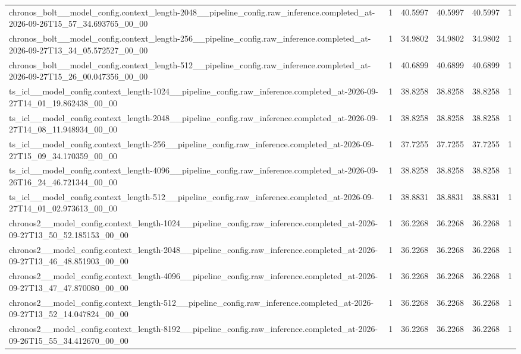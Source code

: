 \begin{tabular}{llllll}
chronos\_bolt\_\_model\_config.context\_length-2048\_\_pipeline\_config.raw\_inference.completed\_at-2026-09-26T15\_57\_34.693765\_00\_00 & 1 & 40.5997 & 40.5997 & 40.5997 & 1 \\
chronos\_bolt\_\_model\_config.context\_length-256\_\_pipeline\_config.raw\_inference.completed\_at-2026-09-27T13\_34\_05.572527\_00\_00 & 1 & 34.9802 & 34.9802 & 34.9802 & 1 \\
chronos\_bolt\_\_model\_config.context\_length-512\_\_pipeline\_config.raw\_inference.completed\_at-2026-09-27T15\_26\_00.047356\_00\_00 & 1 & 40.6899 & 40.6899 & 40.6899 & 1 \\
ts\_icl\_\_model\_config.context\_length-1024\_\_pipeline\_config.raw\_inference.completed\_at-2026-09-27T14\_01\_19.862438\_00\_00 & 1 & 38.8258 & 38.8258 & 38.8258 & 1 \\
ts\_icl\_\_model\_config.context\_length-2048\_\_pipeline\_config.raw\_inference.completed\_at-2026-09-27T14\_08\_11.948934\_00\_00 & 1 & 38.8258 & 38.8258 & 38.8258 & 1 \\
ts\_icl\_\_model\_config.context\_length-256\_\_pipeline\_config.raw\_inference.completed\_at-2026-09-27T15\_09\_34.170359\_00\_00 & 1 & 37.7255 & 37.7255 & 37.7255 & 1 \\
ts\_icl\_\_model\_config.context\_length-4096\_\_pipeline\_config.raw\_inference.completed\_at-2026-09-26T16\_24\_46.721344\_00\_00 & 1 & 38.8258 & 38.8258 & 38.8258 & 1 \\
ts\_icl\_\_model\_config.context\_length-512\_\_pipeline\_config.raw\_inference.completed\_at-2026-09-27T14\_01\_02.973613\_00\_00 & 1 & 38.8831 & 38.8831 & 38.8831 & 1 \\
chronos2\_\_model\_config.context\_length-1024\_\_pipeline\_config.raw\_inference.completed\_at-2026-09-27T13\_50\_52.185153\_00\_00 & 1 & 36.2268 & 36.2268 & 36.2268 & 1 \\
chronos2\_\_model\_config.context\_length-2048\_\_pipeline\_config.raw\_inference.completed\_at-2026-09-27T13\_46\_48.851903\_00\_00 & 1 & 36.2268 & 36.2268 & 36.2268 & 1 \\
chronos2\_\_model\_config.context\_length-4096\_\_pipeline\_config.raw\_inference.completed\_at-2026-09-27T13\_47\_47.870080\_00\_00 & 1 & 36.2268 & 36.2268 & 36.2268 & 1 \\
chronos2\_\_model\_config.context\_length-512\_\_pipeline\_config.raw\_inference.completed\_at-2026-09-27T13\_52\_14.047824\_00\_00 & 1 & 36.2268 & 36.2268 & 36.2268 & 1 \\
chronos2\_\_model\_config.context\_length-8192\_\_pipeline\_config.raw\_inference.completed\_at-2026-09-26T15\_55\_34.412670\_00\_00 & 1 & 36.2268 & 36.2268 & 36.2268 & 1 \\

\end{tabular}
